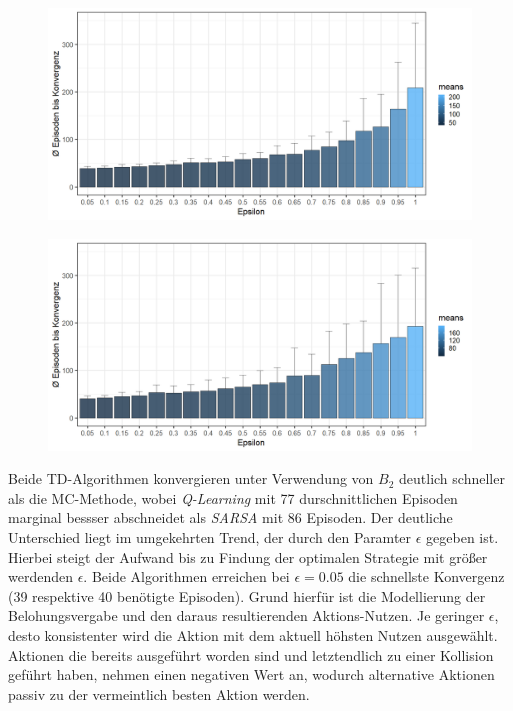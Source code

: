 \begin{figure}[H]
    \centering
    \begin{minipage}{.5\textwidth}
      \centering
      \includegraphics[width=\textwidth]{images/SimpleZ2B2QLearningA}
      \label{fig:test1}
    \end{minipage}%
    \begin{minipage}{.5\textwidth}
      \centering
      \includegraphics[width=\textwidth]{images/SimpleZ2B2SarsaA}
      \label{fig:test2}
    \end{minipage}
\end{figure}
Beide TD-Algorithmen konvergieren unter Verwendung von $B_2$ deutlich schneller als die MC-Methode, wobei \textit{Q-Learning} mit 77 durschnittlichen Episoden marginal bessser abschneidet als \textit{SARSA} mit 86 Episoden. Der deutliche Unterschied liegt im umgekehrten Trend, der durch den Paramter $\epsilon$ gegeben ist. Hierbei steigt der Aufwand bis zu Findung der optimalen Strategie mit größer werdenden $\epsilon$. Beide Algorithmen erreichen bei $\epsilon = 0.05$ die schnellste Konvergenz (39 respektive 40 benötigte Episoden). Grund hierfür ist die Modellierung der Belohungsvergabe und den daraus resultierenden Aktions-Nutzen. Je geringer $\epsilon$, desto konsistenter wird die Aktion mit dem aktuell höhsten Nutzen ausgewählt. Aktionen die bereits  ausgeführt worden sind und letztendlich zu einer Kollision geführt haben, nehmen einen negativen Wert an, wodurch alternative Aktionen passiv zu der vermeintlich besten Aktion werden. 
\par 

